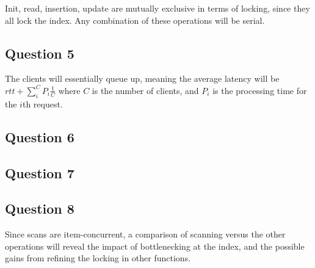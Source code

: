 \documentclass[11pt,a4paper]{article}
\begin{document}
Init, read, insertion, update are mutually exclusive in terms of locking, since
they all lock the index. Any combination of these operations will be serial.

\subsection{Question 5}

The clients will essentially queue up, meaning the average latency will be
$rtt + \sum_i^C P_i \frac 1 C$ where $C$ is the number of clients, and $P_i$ is the
processing time for the $i$th request.




\subsection{Question 6}




\subsection{Question 7}



\subsection{Question 8}
Since scans are item-concurrent, a comparison of scanning versus the other operations
will reveal the impact of bottlenecking at the index, and the possible gains from refining the
locking in other functions.
\end{document}
